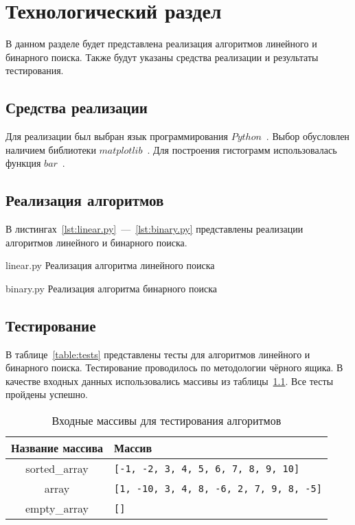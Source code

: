 \chapter{Технологический раздел}

В данном разделе будет представлена реализация алгоритмов линейного и бинарного поиска. Также будут указаны средства реализации и результаты тестирования.

\section{Средства реализации}

Для реализации был выбран язык программирования $Python$~\cite{python}. Выбор обусловлен наличием библиотеки $matplotlib$~\cite{matplotlib}. Для построения гистограмм использовалась функция $bar$~\cite{bar}. 

\section{Реализация алгоритмов}

В листингах~\ref{lst:linear.py}~---~\ref{lst:binary.py} представлены реализации алгоритмов линейного и бинарного поиска.

{linear.py}
{Реализация алгоритма линейного поиска}

\clearpage

{binary.py}
{Реализация алгоритма бинарного поиска}

\section{Тестирование}

В таблице~\ref{table:tests} представлены тесты для алгоритмов линейного и бинарного поиска. Тестирование проводилось по методологии чёрного ящика. В качестве входных данных использовались массивы из таблицы~\ref{table:arrays}. Все тесты пройдены успешно.

\begin{table}[H]
\caption{Входные массивы для тестирования алгоритмов}
\small
\centering\begin{tabular}{|c|m{10cm}|}
        \hline
        \textbf{Название массива} & \textbf{Массив} \\
        \hline
        sorted\_array & \texttt{[-1, -2, 3, 4, 5, 6, 7, 8, 9, 10]} \\
        \hline
        array & \texttt{[1, -10, 3, 4, 8, -6, 2, 7, 9, 8, -5]} \\
        \hline
        empty\_array & \texttt{[]} \\
        \hline
    \end{tabular}
\label{table:arrays}
\end{table}

